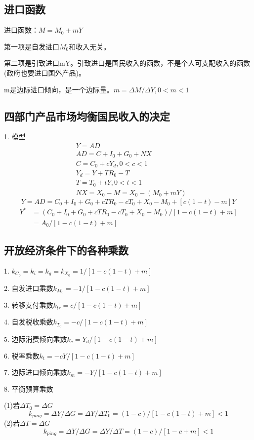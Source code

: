 \documentclass{article}
\begin{document}
\subsection{进口函数}
进口函数：$ M=M_0+mY $

第一项是自发进口$ M_0 $和收入无关。

第二项是引致进口mY。引致进口是国民收入的函数，不是个人可支配收入的函数(政府也要进口国外产品)。

m是边际进口倾向，是一个边际量。$ m=\Delta M/\Delta Y,0<m<1 $

\subsection{四部门产品市场均衡国民收入的决定}
1. 模型
\begin{equation*}
	\begin{split}
	&Y=AD\\
	&AD=C+I_0+G_0+NX\\
	&C=C_0+cY_d,0<c<1\\
	&Y_d=Y+TR_0-T\\
	&T=T_0+tY,0<t<1\\
	&NX=X_0-M=X_0-(M_0+mY)
	\end{split}
\end{equation*}
\[
Y=AD=C_0+I_0+G_0+cTR_0-cT_0+X_0-M_0+[c(1-t)-m]Y
\]
\begin{equation*}
	\begin{split}
	Y^*&=(C_0+I_0+G_0+cTR_0-cT_0+X_0-M_0)/[1-c(1-t)+m]\\
	&=A_0/[1-c(1-t)+m]
	\end{split}
\end{equation*}

\hspace*{\fill}

\subsection{开放经济条件下的各种乘数}
1. $ k_{C_0}=k_i=k_g=k_{X_0}=1/[1-c(1-t)+m] $

2. 自发进口乘数$ k_{M_0}=-1/[1-c(1-t)+m] $

3. 转移支付乘数$ k_{tr}=c/[1-c(1-t)+m] $

4. 自发税收乘数$ k_{T_0}=-c/[1-c(1-t)+m] $

5. 边际消费倾向乘数$ k_c=Y_d/[1-c(1-t)+m] $

6. 税率乘数$ k_t=-cY/[1-c(1-t)+m] $

7. 边际进口倾向乘数$ k_m=-Y/[1-c(1-t)+m] $

8. 平衡预算乘数

(1)若$ \Delta T_0=\Delta G $
\[
k_{ping}=\Delta Y/\Delta G=\Delta Y/\Delta T_0=(1-c)/[1-c(1-t)+m]<1
\]
(2)若$ \Delta T=\Delta G $
\[
k_{ping}=\Delta Y/\Delta G=\Delta Y/\Delta T=(1-c)/[1-c+m]<1
\]
\end{document}
